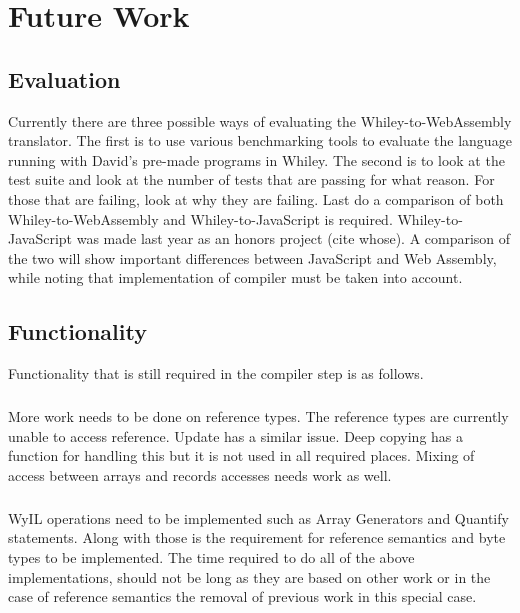 \chapter{Future Work}\label{fw}

\section{Evaluation}

Currently there are three possible ways of evaluating the Whiley-to-WebAssembly translator. The first is to use various benchmarking tools to evaluate the language running with David's pre-made programs in Whiley. The second is to look at the test suite and look at the number of tests that are passing for what reason. For those that are failing, look at why they are failing. Last do a comparison of both Whiley-to-WebAssembly and Whiley-to-JavaScript is required. Whiley-to-JavaScript was made last year as an honors project (cite whose). A comparison of the two will show important differences between JavaScript and Web Assembly, while noting that implementation of compiler must be taken into account.

\section{Functionality}

Functionality that is still required in the compiler step is as follows. 

\paragraph{}
More work needs to be done on reference types. The reference types are currently unable to access reference. Update has a similar issue.  Deep copying has a function for handling this but it is not used in all required places. Mixing of access between arrays and records accesses needs work as well. 

\paragraph{}
WyIL operations need to be implemented such as Array Generators and Quantify statements. Along with those is the requirement for reference semantics and byte types to be implemented. The time required to do all of the above implementations, should not be long as they are based on other work or in the case of reference semantics the removal of previous work in this special case.

